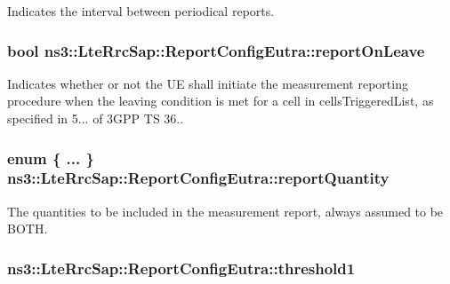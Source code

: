 Indicates the interval between periodical reports. 

\subsubsection[{\texorpdfstring{report\+On\+Leave}{reportOnLeave}}]{\setlength{\rightskip}{0pt plus 5cm}bool ns3\+::\+Lte\+Rrc\+Sap\+::\+Report\+Config\+Eutra\+::report\+On\+Leave}\hypertarget{structns3_1_1LteRrcSap_1_1ReportConfigEutra_a1463979cc3e1e6165cfd1ed8d5bc8547}{}\label{structns3_1_1LteRrcSap_1_1ReportConfigEutra_a1463979cc3e1e6165cfd1ed8d5bc8547}


Indicates whether or not the UE shall initiate the measurement reporting procedure when the leaving condition is met for a cell in {\ttfamily cells\+Triggered\+List}, as specified in 5... of 3\+G\+PP TS 36.. 

\subsubsection[{\texorpdfstring{report\+Quantity}{reportQuantity}}]{\setlength{\rightskip}{0pt plus 5cm}enum \{ ... \}   ns3\+::\+Lte\+Rrc\+Sap\+::\+Report\+Config\+Eutra\+::report\+Quantity}\hypertarget{structns3_1_1LteRrcSap_1_1ReportConfigEutra_a0ee165efb82a05284ca7718ec1387aca}{}\label{structns3_1_1LteRrcSap_1_1ReportConfigEutra_a0ee165efb82a05284ca7718ec1387aca}


The quantities to be included in the measurement report, always assumed to be B\+O\+TH. 

\subsubsection[{\texorpdfstring{threshold1}{threshold1}}]{ ns3\+::\+Lte\+Rrc\+Sap\+::\+Report\+Config\+Eutra\+::threshold1}\hypertarget{structns3_1_1LteRrcSap_1_1ReportConfigEutra_a8f36bc45a61054920e490be8bf33b4ca}{}\label{structns3_1_1LteRrcSap_1_1ReportConfigEutra_a8f36bc45a61054920e490be8bf33b4ca}


